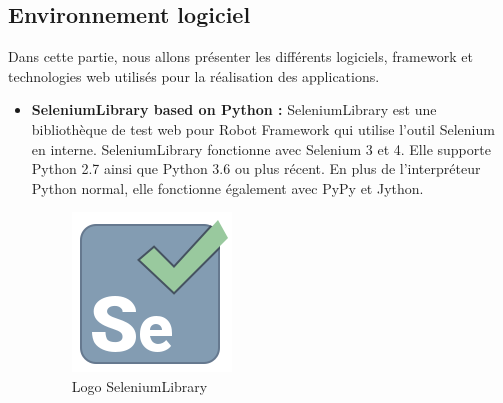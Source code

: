 \subsection[Environnement logiciel]{Environnement logiciel}
Dans cette partie, nous allons présenter les différents logiciels, framework et technologies web utilisés pour la réalisation des applications.
\begin{itemize}
	\item \textbf{SeleniumLibrary based on Python :} SeleniumLibrary est une bibliothèque de test web pour Robot Framework qui utilise l'outil Selenium en interne. SeleniumLibrary fonctionne avec Selenium 3 et 4. Elle supporte Python 2.7 ainsi que Python 3.6 ou plus récent. En plus de l'interpréteur Python normal, elle fonctionne également avec PyPy et Jython. 
	\begin{figure}[H]
		\centering
		\includegraphics[width=0.08\linewidth]{img/logos/selenium}
		\caption[Logo SeleniumLibrary]{Logo SeleniumLibrary}
		\label{fig:selenium}
	\end{figure}


\end{itemize}
